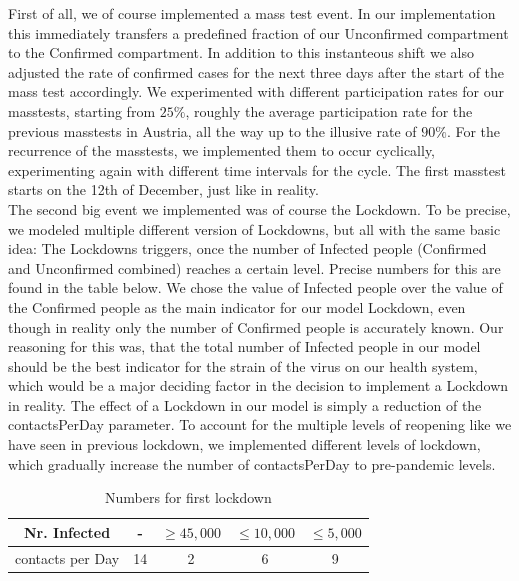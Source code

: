 \documentclass
[
    a4paper,
    11pt,
    bibliography = totoc,
    listof = totoc,
    headinclude = true,
]
{scrreport}
\begin{document}
First of all, we of course implemented a mass test event. In our implementation
this immediately transfers a predefined fraction of our Unconfirmed compartment
to the Confirmed compartment. In addition to this instanteous shift we also
adjusted the rate of confirmed cases for the next three days after the start of
the mass test accordingly. We experimented with different participation rates
for our masstests, starting from $25\%$, roughly the average participation rate
for the previous masstests in Austria, all the way up to the illusive rate of $90\%$.
For the recurrence of the masstests, we implemented them to occur cyclically,
experimenting again with different time intervals for the cycle. The first masstest
starts on the 12th of December, just like in reality.\\

The second big event we implemented was of course the Lockdown. To be precise,
we modeled multiple different version of Lockdowns, but all with the same basic idea:
The Lockdowns triggers, once the number of Infected people (Confirmed and Unconfirmed combined)
reaches a certain level. Precise numbers for this are found in the table below.
We chose the value of Infected people over the value of
the Confirmed people as the main indicator for our model Lockdown, even though
in reality only the number of Confirmed people is accurately known.
Our reasoning for this was, that the total number of Infected people in our
model should be the best indicator for the strain of the virus on our health system,
which would be a major deciding factor in the decision to implement a Lockdown in reality.
The effect of a Lockdown in our model is simply a reduction of the contactsPerDay parameter.
To account for the multiple levels of reopening like we have seen in previous
lockdown, we implemented different levels of lockdown, which gradually increase
the number of contactsPerDay to pre-pandemic levels.
\begin{table}[!h]
  \begin{center}
  \begin{tabular}{|c||c|c|c|c|}
  \hline
    Nr. Infected &- & $\geq 45,000$ & $\leq 10,000$ & $\leq 5,000$ \\
    \hline
    contacts per Day & 14 & 2 & 6 & 9 \\
    \hline
  \end{tabular}
  \end{center}
  \caption{Numbers for first lockdown}
\end{table}
\end{document}
